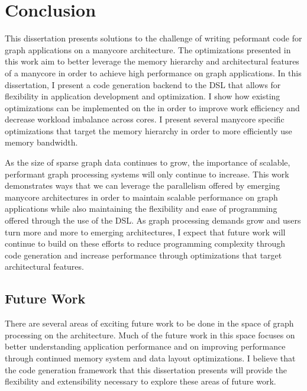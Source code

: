 \chapter{Conclusion}\label{gen:sec:conclusion}

This dissertation presents solutions to the challenge of writing peformant code for graph applications on a manycore architecture. 
The optimizations presented in this work aim to better leverage the memory hierarchy and architectural features of a manycore in order to achieve high performance on graph applications. 
In this dissertation, I present a code generation backend to the \graphit DSL that allows for flexibility in application development and optimization. 
I show how existing optimizations can be implemented on the \hbmc in order to improve work efficiency and decrease workload imbalance across cores. 
I present several manycore specific optimizations that target the memory hierarchy in order to more efficiently use memory bandwidth.

As the size of sparse graph data continues to grow, the importance of scalable, performant graph processing systems will only continue to increase. 
This work demonstrates ways that we can leverage the parallelism offered by emerging manycore architectures in order to maintain scalable performance on graph applications while also maintaining the flexibility and ease of programming offered through the use of the \graphit DSL. 
As graph processing demands grow and users turn more and more to emerging architectures, I expect that future work will continue to build on these efforts to reduce programming complexity through code generation and increase performance through optimizations that target architectural features. 

\section{Future Work}
There are several areas of exciting future work to be done in the space of graph processing on the \hbmc architecture. 
Much of the future work in this space focuses on better understanding application performance and on improving performance through continued memory system and data layout optimizations.
I believe that the code generation framework that this dissertation presents will provide the flexibility and extensibility necessary to explore these areas of future work.

